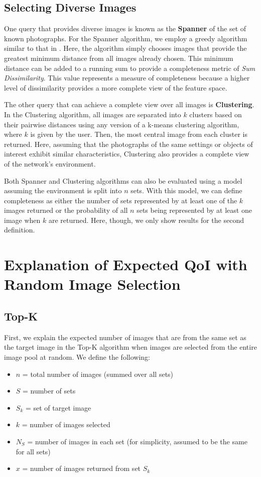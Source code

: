 {\subsection{Selecting Diverse Images}
One query that provides diverse images is known as the {\bf Spanner} of the set of known photographs.  For the Spanner algorithm, we employ a greedy algorithm similar to that in \cite{mediascope}.  Here, the algorithm simply chooses images that provide the greatest minimum distance from all images already chosen.  This minimum distance can be added to a running sum to provide a completeness metric of \emph{Sum Dissimilarity}.  This value represents a measure of completeness because a higher level of dissimilarity provides a more complete view of the feature space.

The other query that can achieve a complete view over all images is {\bf Clustering}.  In the Clustering algorithm, all images are separated into $k$ clusters based on their pairwise distances using any version of a k-means clustering algorithm, where $k$ is given by the user.  Then, the most central image from each cluster is returned.  
Here, assuming that the photographs of the same settings or objects of interest exhibit similar characteristics, 
Clustering also provides a complete view of the network's environment.

Both Spanner and Clustering algorithms can also be evaluated using a model assuming the environment is split into $n$ sets.  With this model, we can define completeness as either the number of sets represented by at least one of the $k$ images returned or the probability of all $n$ sets being represented by at least one image when $k$ are returned.  Here, though, we only show results for the second definition.
}

\section{Explanation of Expected QoI with Random Image Selection}
\label{sec:expl_exp_qoi}

\subsection{Top-K}
First, we explain the expected number of images that are from the same set as the target image in the Top-K algorithm when images are selected from the entire image pool at random.  We define the following:  

\begin{itemize}
	\item $n$ = total number of images (summed over all sets)
	\item $S$ = number of sets
	\item $S_k$ = set of target image
	\item $k$ = number of images selected
	\item $N_{S}$ = number of images in each set (for simplicity, assumed to be the same for all sets)
	\item $x$ = number of images returned from set $S_k$
\end{itemize}

